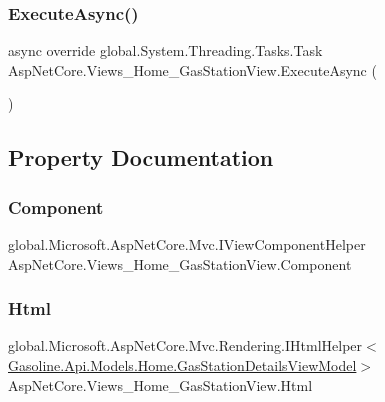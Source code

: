 \subsubsection{\texorpdfstring{ExecuteAsync()}{ExecuteAsync()}}
{\footnotesize\ttfamily async override global.\+System.\+Threading.\+Tasks.\+Task Asp\+Net\+Core.\+Views\+\_\+\+Home\+\_\+\+Gas\+Station\+View.\+Execute\+Async (\begin{DoxyParamCaption}{ }\end{DoxyParamCaption})}



\subsection{Property Documentation}
\mbox{\label{class_asp_net_core_1_1_views___home___gas_station_view_a74af5c72f03af3fd4458e2240af181b4}} 
\subsubsection{\texorpdfstring{Component}{Component}}
{\footnotesize\ttfamily global.\+Microsoft.\+Asp\+Net\+Core.\+Mvc.\+I\+View\+Component\+Helper Asp\+Net\+Core.\+Views\+\_\+\+Home\+\_\+\+Gas\+Station\+View.\+Component\hspace{0.3cm}{\ttfamily [get]}}

\mbox{\label{class_asp_net_core_1_1_views___home___gas_station_view_a85d62e8171cc725e10d3a3aaeb034580}} 
\subsubsection{\texorpdfstring{Html}{Html}}
{\footnotesize\ttfamily global.\+Microsoft.\+Asp\+Net\+Core.\+Mvc.\+Rendering.\+I\+Html\+Helper$<$\mbox{\hyperlink{class_gasoline_1_1_api_1_1_models_1_1_home_1_1_gas_station_details_view_model}{Gasoline.\+Api.\+Models.\+Home.\+Gas\+Station\+Details\+View\+Model}}$>$ Asp\+Net\+Core.\+Views\+\_\+\+Home\+\_\+\+Gas\+Station\+View.\+Html\hspace{0.3cm}{\ttfamily [get]}}

